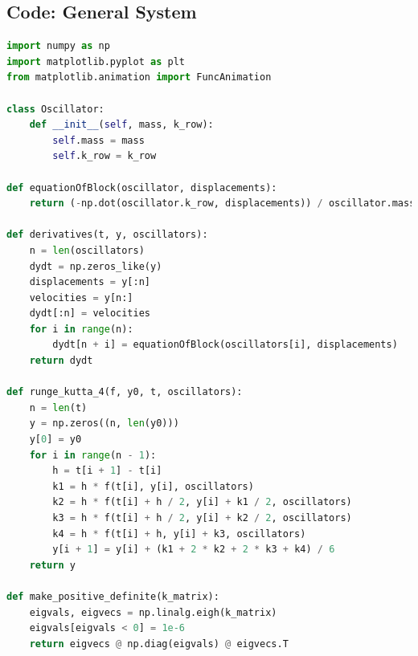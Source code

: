\documentclass[a4paper,12pt]{article}
\begin{document}
\subsection*{Code: General System}
\begin{lstlisting}[language=Python, caption=General system of $n$ coupled oscillators]
import numpy as np
import matplotlib.pyplot as plt
from matplotlib.animation import FuncAnimation

class Oscillator:
    def __init__(self, mass, k_row):
        self.mass = mass
        self.k_row = k_row

def equationOfBlock(oscillator, displacements):
    return (-np.dot(oscillator.k_row, displacements)) / oscillator.mass

def derivatives(t, y, oscillators):
    n = len(oscillators)
    dydt = np.zeros_like(y)
    displacements = y[:n]
    velocities = y[n:]
    dydt[:n] = velocities
    for i in range(n):
        dydt[n + i] = equationOfBlock(oscillators[i], displacements)
    return dydt

def runge_kutta_4(f, y0, t, oscillators):
    n = len(t)
    y = np.zeros((n, len(y0)))
    y[0] = y0
    for i in range(n - 1):
        h = t[i + 1] - t[i]
        k1 = h * f(t[i], y[i], oscillators)
        k2 = h * f(t[i] + h / 2, y[i] + k1 / 2, oscillators)
        k3 = h * f(t[i] + h / 2, y[i] + k2 / 2, oscillators)
        k4 = h * f(t[i] + h, y[i] + k3, oscillators)
        y[i + 1] = y[i] + (k1 + 2 * k2 + 2 * k3 + k4) / 6
    return y

def make_positive_definite(k_matrix):
    eigvals, eigvecs = np.linalg.eigh(k_matrix)
    eigvals[eigvals < 0] = 1e-6
    return eigvecs @ np.diag(eigvals) @ eigvecs.T


\end{lstlisting}
\end{document}
